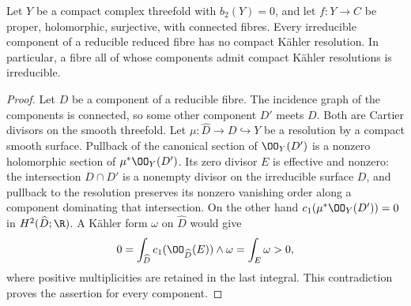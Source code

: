 
\begin{proposition}\label{cdp:st:C.3.4}
Let $Y$ be a compact complex threefold with $b_2(Y)=0$, and let
$f:Y\to C$ be proper, holomorphic, surjective, with connected fibres.
Every irreducible component of a reducible reduced fibre has no
compact K\"ahler resolution. In particular, a fibre all of whose
components admit compact K\"ahler resolutions is irreducible.
\end{proposition}
\begin{proof}
Let $D$ be a component of a reducible fibre. The incidence graph of
the components is connected, so some other component $D'$ meets $D$.
Both are Cartier divisors on the smooth threefold. Let
$\mu:\widehat D\to D\hookrightarrow Y$ be a resolution by a compact
smooth surface. Pullback of the canonical section of $\OO_Y(D')$
is a nonzero holomorphic section of $\mu^*\OO_Y(D')$. Its zero
divisor $E$ is effective and nonzero: the intersection $D\cap D'$
is a nonempty divisor on the irreducible surface $D$, and pullback
to the resolution preserves its nonzero vanishing order along a
component dominating that intersection. On the other hand
$c_1(\mu^*\OO_Y(D'))=0$ in $H^2(\widehat D;\R)$.
A K\"ahler form $\omega$ on $\widehat D$ would give
\[
0=\int_{\widehat D}c_1(\OO_{\widehat D}(E))\wedge\omega
 =\int_E\omega>0,
\]
where positive multiplicities are retained in the last integral.
This contradiction proves the assertion for every component.
\end{proof}


